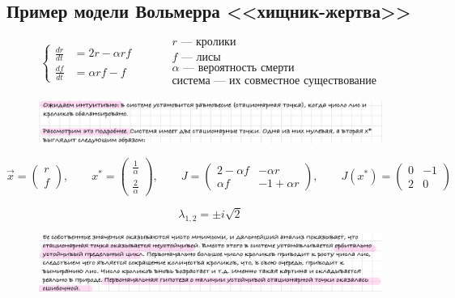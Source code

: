 	\subsection{Пример модели Вольмерра <<хищник-жертва>>}
	
	\[
	\left\{
	\begin{aligned}
		\frac{dr}{dt} &= 2r - \alpha rf \\
		\frac{df}{dt} &= \alpha rf - f
	\end{aligned}
	\right.
	\qquad
	\begin{aligned}
		&r \text{ — кролики} \\
		&f \text{ — лисы} \\
		&\alpha  \text{ — вероятность смерти} \\
		&\text{система — их совместное существование}
	\end{aligned}
	\]
	\vspace{-1em}
	\begin{figure}[H]
		\centering
		\includegraphics[width=1\linewidth, height=0.1\textheight]{img/30_03}
		\label{fig:30_03}
	\end{figure}
	\vspace{-1em}
	\[
	\vec{x} = 
	\begin{pmatrix}
		r \\
		f
	\end{pmatrix}, \qquad
	x^* = 
	\begin{pmatrix}
		\frac{1}{\alpha} \\
		\frac{2}{\alpha}
	\end{pmatrix}, \qquad
	J = 
	\begin{pmatrix}
		2 - \alpha f & -\alpha r \\
		\alpha f & -1 + \alpha r
	\end{pmatrix}, \qquad
	J(x^*) = 
	\begin{pmatrix}
		0 & -1 \\
		2 & 0
	\end{pmatrix}
	\]
	
	\[
	\lambda_{1,2} = \pm i\sqrt{2}
	\]
	\newpage
	\begin{figure}[H]
		\centering
		\includegraphics[width=1\linewidth, height=0.2\textheight]{img/30_04}
		\label{fig:30_04}
	\end{figure}
	\vspace{-2.5em}

